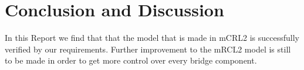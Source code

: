 \section{Conclusion and Discussion}

In this Report we find that that the model that is made in mCRL2 is successfully verified by our requirements. Further improvement to the mRCL2 model is still to be made in order to get more control over every bridge component.
